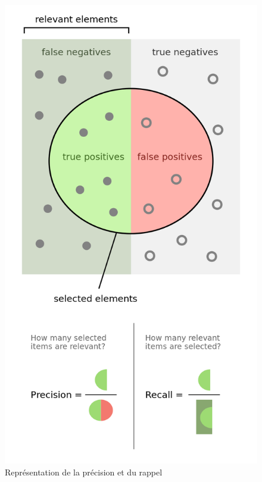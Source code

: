 \begin{figure}[htp]
 \begin{center}
  \includegraphics[scale=0.3]{figures/precisionrecall.png}
  \caption{Représentation de la précision et du rappel \cite{WIKI}}
  \label{fig:precisonrecall} %
 \end{center}
\end{figure}

